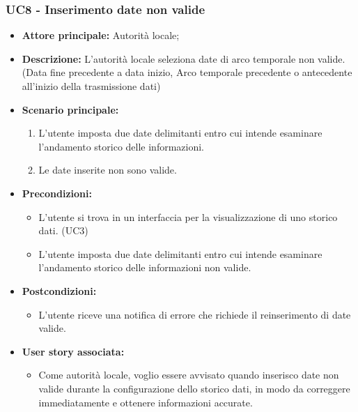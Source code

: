 \documentclass{article}
\begin{document}
\subsubsection{UC8 - Inserimento date non valide}
\begin{itemize}
    \item \textbf{Attore principale:} Autorità locale;
    \item \textbf{Descrizione:} L’autorità locale seleziona date di arco temporale non valide. (Data fine precedente a data inizio, Arco temporale precedente o antecedente all'inizio della trasmissione dati)
    \item \textbf{Scenario principale:}
          \begin{enumerate}
              \item L'utente imposta due date delimitanti entro cui intende esaminare l'andamento storico delle informazioni.
              \item Le date inserite non sono valide.
          \end{enumerate}
    \item \textbf{Precondizioni:}
          \begin{itemize}
              \item  L'utente si trova in un interfaccia per la visualizzazione di uno storico dati.  (UC3)
              \item L'utente imposta due date delimitanti entro cui intende esaminare l'andamento storico delle informazioni
                    non valide.
          \end{itemize}
    \item \textbf{Postcondizioni:}
          \begin{itemize}
              \item  L'utente riceve una notifica di errore che richiede il reinserimento di date valide.
          \end{itemize}
    \item \textbf{User story associata:}
          \begin{itemize}
              \item Come autorità locale, voglio essere avvisato quando inserisco date non valide durante la configurazione dello storico dati, in modo da correggere immediatamente e ottenere informazioni accurate.
          \end{itemize}
\end{itemize}
\end{document}
